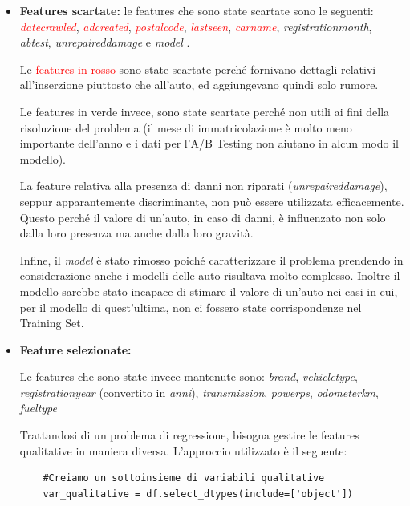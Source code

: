 \begin{itemize}
    \item \textbf{Features scartate:}
    le features che sono state scartate sono le seguenti: \textcolor{red}{\textit{date\textunderscore crawled}}, \textcolor{red}{\textit{ad\textunderscore created}}, \textcolor{red}{\textit{postal\textunderscore code}}, \textcolor{red}{\textit{last\textunderscore seen}}, \textcolor{red}{\textit{car\textunderscore name}}, \textcolor[HTML]{00AA00}{\textit{registration\textunderscore month}}, \textcolor[HTML]{00AA00}{\textit{ab\textunderscore test}}, \textit{unrepaired\textunderscore damage} e \textit{model} .    
    
    Le \textcolor{red}{features in rosso} sono state scartate perché fornivano dettagli relativi all'inserzione piuttosto che all'auto, ed aggiungevano quindi solo rumore.

    Le \textcolor[HTML]{00AA00}{features in verde} invece, sono state scartate perché non utili ai fini della risoluzione del problema (il mese di immatricolazione è molto meno importante dell'anno e i dati per l'A/B Testing non aiutano in alcun modo il modello).

    La feature relativa alla presenza di danni non riparati (\textit{unrepaired\textunderscore damage}), seppur apparantemente discriminante, non può essere utilizzata efficacemente. Questo perché il valore di un'auto, in caso di danni, è influenzato non solo dalla loro presenza ma anche dalla loro gravità.
    
    Infine, il \textit{model} è stato rimosso poiché caratterizzare il problema prendendo in considerazione anche i modelli delle auto risultava molto complesso. Inoltre il modello sarebbe stato incapace di stimare il valore di un'auto nei casi in cui, per il modello di quest'ultima, non ci fossero state corrispondenze nel Training Set.

    \pagebreak
    \item \textbf{Feature selezionate:}

    Le features che sono state invece mantenute sono: \textit{brand}, \mbox{\textit{vehicle\textunderscore type}}, \textit{registration\textunderscore year} (convertito in \textit{anni}), \textit{transmission}, \mbox{\textit{power\textunderscore ps}}, \mbox{\textit{odometer\textunderscore km}}, \textit{fuel\textunderscore type}


    Trattandosi di un problema di regressione, bisogna gestire le features qualitative in maniera diversa. L'approccio utilizzato è il seguente:
    \medskip
    \begin{lstlisting}
    #Creiamo un sottoinsieme di variabili qualitative
    var_qualitative = df.select_dtypes(include=['object'])
    

\end{lstlisting}
\end{itemize}
